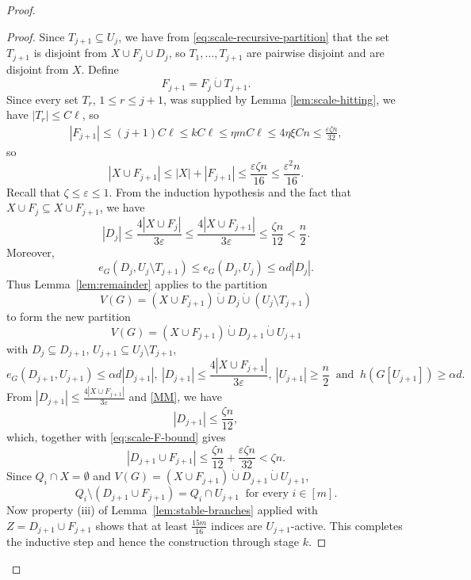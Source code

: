 \documentclass[11pt,a4paper]{article}
\theoremstyle{definition}
\theoremstyle{remark}
\newcommand{\eps}{\varepsilon}
\begin{document}
\begin{proof}
\begin{proof}
Since $T_{j+1}\subseteq U_j$, we have from 
\eqref{eq:scale-recursive-partition} that  the set
$T_{j+1}$ is disjoint from $X\cup F_j\cup D_j$, so 
$T_1,\ldots,T_{j+1}$ are pairwise disjoint and are disjoint from
$X$. Define
\[
 F_{j+1}=F_j\mathbin{\dot\cup}T_{j+1}.
\]
Since every set $T_r$, $1\le r\le j+1$, was supplied by Lemma \ref{lem:scale-hitting}, we have $|T_r|\le C\ell$,
so
\begin{equation}\label{eq:scale-F-bound}
 \begin{aligned}
 |F_{j+1}|
 \le (j+1)C\ell
 \le kC\ell
 \le\eta mC\ell
 \le4\eta\xi Cn
 \le\frac{\eps\zeta n}{32},
 \end{aligned}
\end{equation}
so
\begin{equation}\label{MM}
 |X\cup F_{j+1}|\le |X|+|F_{j+1}|
 \le\frac{\eps\zeta n}{16}
 \le\frac{\eps^2n}{16}.
\end{equation}
Recall that $\zeta\le\eps\le1$. From the induction hypothesis and the fact that 
$X\cup F_j\subseteq X\cup F_{j+1}$, we have
\[
 |D_j|
 \le\frac{4|X\cup F_j|}{3\eps}
 \le\frac{4|X\cup F_{j+1}|}{3\eps}
 \le\frac{\zeta n}{12}<\frac{n}{2}.
\]
Moreover,
\[
 e_G(D_j,U_j\setminus T_{j+1})
 \le e_G(D_j,U_j)
 \le\alpha d|D_j|.
\]
Thus Lemma~\ref{lem:remainder} applies to the partition
\[
 V(G)=(X\cup F_{j+1})\mathbin{\dot\cup}D_j
       \mathbin{\dot\cup}(U_j\setminus T_{j+1})
\]
to form the new partition 
\[
 V(G)=(X\cup F_{j+1})\mathbin{\dot\cup}D_{j+1}
       \mathbin{\dot\cup}U_{j+1}
\]
with 
$ D_j\subseteq D_{j+1}$,  
$U_{j+1}\subseteq U_j\setminus T_{j+1}$,
\[
 e_G(D_{j+1},U_{j+1})\le\alpha d|D_{j+1}|,
 \ 
 |D_{j+1}|\le\frac{4|X\cup F_{j+1}|}{3\eps},
\  
 |U_{j+1}|\ge\frac{n}{2}
 \  \text{ and }\ 
 h(G[U_{j+1}])\ge\alpha d.
\]
From $|D_{j+1}|\le\frac{4|X\cup F_{j+1}|}{3\eps}$ and \eqref{MM}, we have 
\[
 |D_{j+1}|\le\frac{\zeta n}{12},
\]
which, together with
\eqref{eq:scale-F-bound} gives
 \[
 |D_{j+1}\cup F_{j+1}|
 \le\frac{\zeta n}{12}+\frac{\eps\zeta n}{32}
 <\zeta n.
\]
Since $Q_i\cap X=\emptyset$ and $V(G)=(X\cup F_{j+1})\mathbin{\dot\cup}D_{j+1}
       \mathbin{\dot\cup}U_{j+1}$,
\[
 Q_i\setminus(D_{j+1}\cup F_{j+1})=Q_i\cap U_{j+1}
\ \text{ for every }i\in[m].
\]
Now property (iii) of Lemma~\ref{lem:stable-branches} applied
with $Z=D_{j+1}\cup F_{j+1}$ shows that at least
$\frac{15m}{16}$ indices are $U_{j+1}$-active. This completes the
inductive step and hence the construction through stage $k$.
\end{proof} 


\end{proof}
\end{document}
